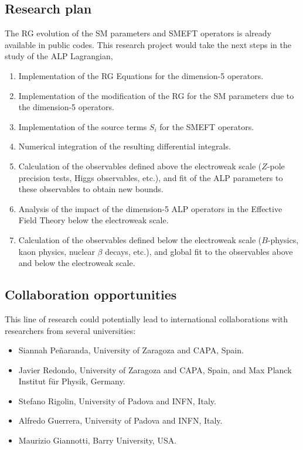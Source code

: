 \documentclass[combined.tex]{subfiles}
\begin{document}
\subsection{Research plan}
The RG evolution of the SM parameters and SMEFT operators is already available in public codes. This research project would take the next steps in the study of the ALP Lagrangian,
\begin{enumerate}
\item Implementation of the RG Equations for the dimension-5 operators.
\item Implementation of the modification of the RG for the SM parameters due to the dimension-5 operators.
\item Implementation of the source terms $S_i$ for the SMEFT operators.
\item Numerical integration of the resulting differential integrals.
\item Calculation of the observables defined above the electroweak scale ($Z$-pole precision tests, Higgs observables, etc.), and fit of the ALP parameters to these observables to obtain new bounds.
\item Analysis of the impact of the dimension-5 ALP operators in the Effective Field Theory below the electroweak scale.
\item Calculation of the observables defined below the electroweak scale ($B$-physics, kaon physics, nuclear $\beta$ decays, etc.), and global fit to the observables above and below the electroweak scale.
\end{enumerate}

\subsection{Collaboration opportunities}
This line of research could potentially lead to international collaborations with researchers from several universities: 
\begin{itemize}
\item Siannah Peñaranda, University of Zaragoza and CAPA, Spain.
\item Javier Redondo, University of Zaragoza and CAPA, Spain, and Max Planck Institut für Physik, Germany.
\item Stefano Rigolin, University of Padova and INFN, Italy.
\item Alfredo Guerrera, University of Padova and INFN, Italy.
\item Maurizio Giannotti, Barry University, USA.
\end{itemize}
\end{document}
